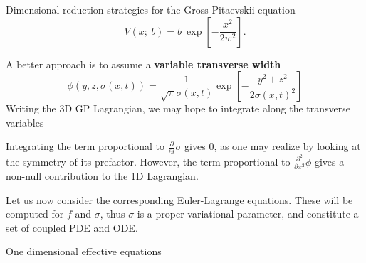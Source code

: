 \documentclass[final]{beamer}
\newlength{\colwidth}
\begin{document}
\begin{frame}[t]
\begin{columns}[t]
\begin{column}{\colwidth}
\begin{exampleblock}{Dimensional reduction strategies for the Gross-Pitaevskii equation}{}
        \begin{equation}
          V(x; \ b) = b \ \exp[-\frac{x^2}{2 w^2}].
        \end{equation}


          A better approach is to assume a \textbf{variable transverse width} 
        \begin{equation}
            \phi(y, z, \sigma(x, t)) = \dfrac{1}{\sqrt{\pi} \sigma(x, t)} \exp\left[-\frac{y^2+z^2}{2\sigma(x, t)^2}\right]
        \end{equation}
        Writing the 3D GP Lagrangian, we may hope to integrate along the transverse variables

          Integrating the term proportional to $\frac{\partial}{\partial t} \sigma$ gives $0$, as one may realize by looking at the symmetry of its prefactor. However, the term proportional to $\frac{\partial^2}{\partial x^2} \phi$ gives a non-null contribution to the 1D Lagrangian.
           
          Let us now consider the corresponding Euler-Lagrange equations. These will be computed for $f$ and $\sigma$, thus $\sigma$ is a proper variational parameter, and constitute a set of coupled PDE and ODE.
          
   
      \end{exampleblock}

      \begin{block}{One dimensional effective equations}


\end{block}
\end{column}
\end{columns}
\end{frame}
\end{document}
